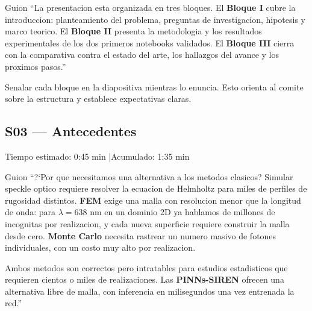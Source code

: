 \begin{slidebox}{Guion}
``La presentacion esta organizada en tres bloques. El \textbf{Bloque I} cubre la
introduccion: planteamiento del problema, preguntas de investigacion, hipotesis
y marco teorico. El \textbf{Bloque II} presenta la metodologia y los resultados
experimentales de los dos primeros notebooks validados. El \textbf{Bloque III}
cierra con la comparativa contra el estado del arte, los hallazgos del avance y
los proximos pasos.''
\end{slidebox}
\vspace{4pt}

\begin{tipbox}
Senalar cada bloque en la diapositiva mientras lo enuncia. Esto orienta al comite
sobre la estructura y establece expectativas claras.
\end{tipbox}

\vspace{8pt}

\subsection{S03 --- Antecedentes}

\begin{timebox}
Tiempo estimado: 0:45 min \quad|\quad Acumulado: 1:35 min
\end{timebox}
\vspace{4pt}

\begin{slidebox}{Guion}
``?`Por que necesitamos una alternativa a los metodos clasicos? Simular speckle
optico requiere resolver la ecuacion de Helmholtz para miles de perfiles de rugosidad
distintos. \textbf{FEM} exige una malla con resolucion menor que la longitud de onda:
para $\lambda = 638$ nm en un dominio 2D ya hablamos de millones de incognitas por
realizacion, y cada nueva superficie requiere construir la malla desde cero. \textbf{Monte
Carlo} necesita rastrear un numero masivo de fotones individuales, con un costo muy
alto por realizacion.
\vspace{4pt}

Ambos metodos son correctos pero intratables para estudios estadisticos que requieren
cientos o miles de realizaciones. Las \textbf{PINNs-SIREN} ofrecen una alternativa
libre de malla, con inferencia en milisegundos una vez entrenada la red.''
\end{slidebox}
\vspace{4pt}

